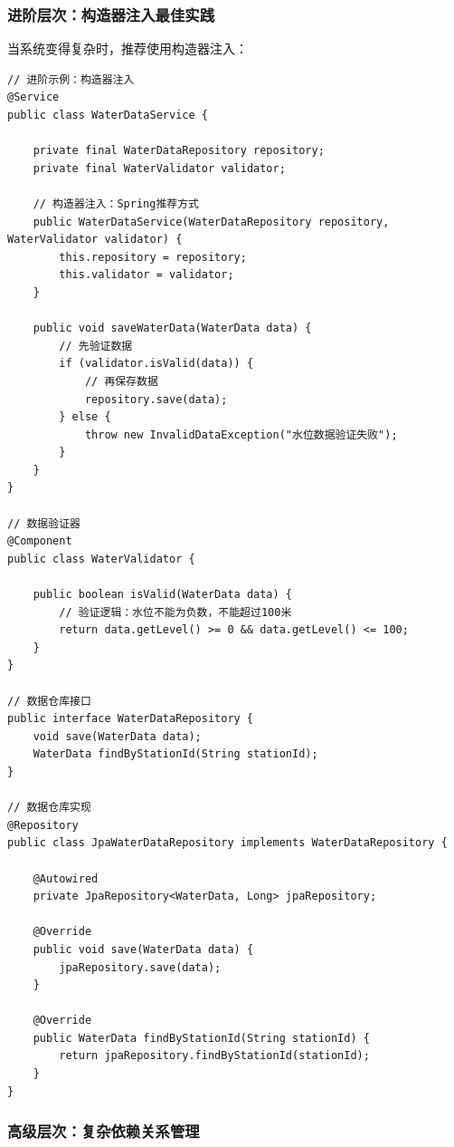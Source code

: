 \hypertarget{ux8fdbux9636ux5c42ux6b21ux6784ux9020ux5668ux6ce8ux5165ux6700ux4f73ux5b9eux8df5}{%
\subsubsection{进阶层次：构造器注入最佳实践}\label{ux8fdbux9636ux5c42ux6b21ux6784ux9020ux5668ux6ce8ux5165ux6700ux4f73ux5b9eux8df5}}

当系统变得复杂时，推荐使用构造器注入：

\begin{lstlisting}[style=java]
// 进阶示例：构造器注入
@Service
public class WaterDataService {
    
    private final WaterDataRepository repository;
    private final WaterValidator validator;
    
    // 构造器注入：Spring推荐方式
    public WaterDataService(WaterDataRepository repository, WaterValidator validator) {
        this.repository = repository;
        this.validator = validator;
    }
    
    public void saveWaterData(WaterData data) {
        // 先验证数据
        if (validator.isValid(data)) {
            // 再保存数据
            repository.save(data);
        } else {
            throw new InvalidDataException("水位数据验证失败");
        }
    }
}

// 数据验证器
@Component
public class WaterValidator {
    
    public boolean isValid(WaterData data) {
        // 验证逻辑：水位不能为负数，不能超过100米
        return data.getLevel() >= 0 && data.getLevel() <= 100;
    }
}

// 数据仓库接口
public interface WaterDataRepository {
    void save(WaterData data);
    WaterData findByStationId(String stationId);
}

// 数据仓库实现
@Repository
public class JpaWaterDataRepository implements WaterDataRepository {
    
    @Autowired
    private JpaRepository<WaterData, Long> jpaRepository;
    
    @Override
    public void save(WaterData data) {
        jpaRepository.save(data);
    }
    
    @Override
    public WaterData findByStationId(String stationId) {
        return jpaRepository.findByStationId(stationId);
    }
}
\end{lstlisting}

\hypertarget{ux9ad8ux7ea7ux5c42ux6b21ux590dux6742ux4f9dux8d56ux5173ux7cfbux7ba1ux7406}{%
\subsubsection{高级层次：复杂依赖关系管理}\label{ux9ad8ux7ea7ux5c42ux6b21ux590dux6742ux4f9dux8d56ux5173ux7cfbux7ba1ux7406}}

